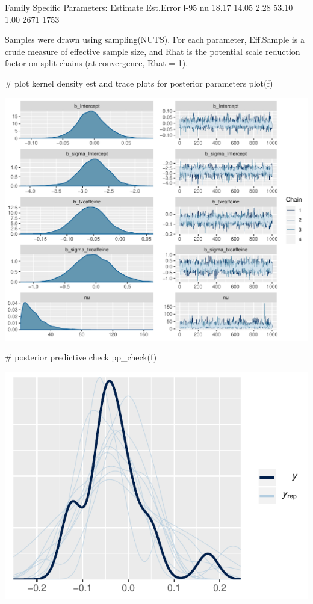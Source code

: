 \begin{Schunk}
\begin{Soutput}
Family Specific Parameters: 
   Estimate Est.Error l-95%
nu    18.17     14.05     2.28    53.10 1.00     2671     1753

Samples were drawn using sampling(NUTS). For each parameter, Eff.Sample 
is a crude measure of effective sample size, and Rhat is the potential 
scale reduction factor on split chains (at convergence, Rhat = 1).
\end{Soutput}
\begin{Sinput}
# plot kernel density est and trace plots for posterior parameters
plot(f)
\end{Sinput}


\centerline{\includegraphics[width=\maxwidth]{htest-bayesfit2b-1} }

\end{Schunk}

\begin{Schunk}
\begin{Sinput}
# posterior predictive check
pp_check(f)
\end{Sinput}


\centerline{\includegraphics[width=\maxwidth]{htest-bayesfit2c-1} }

\end{Schunk}

